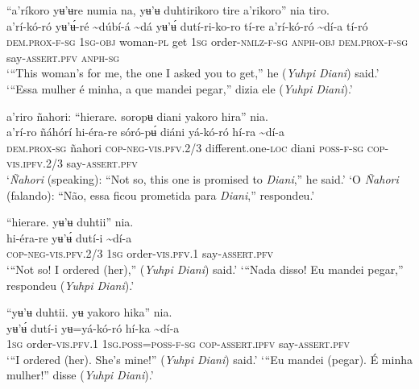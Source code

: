 \documentclass[output=paper,
modfonts,nonflat
]{langsci/langscibook}
\begin{document}
\ea “a’ríkoro yʉ’ʉre numia na, yʉ’ʉ duhtirikoro tire a’rikoro” nia tiro. \\[.3em]
\gll a’rí-kó-ró	yʉ’ʉ́-ré	{\textasciitilde}dúbí-á	{\textasciitilde}dá yʉ’ʉ́	dutí-ri-ko-ro	tí-re	a’rí-kó-ró	{\textasciitilde}dí-a	tí-ró \\
     \textsc{dem.prox-f-sg}	\textsc{1sg-obj}	woman-\textsc{pl}	get 1\textsc{sg}	order-\textsc{nmlz-f-sg}	\textsc{anph-obj}	\textsc{dem.prox-f-sg}	say-\textsc{assert.pfv}	\textsc{anph-sg} \\
\glt ‘“This woman's for me, the one I asked you to get,” he (\textit{Yuhpi Diani}) said.’
\glt ‘“Essa mulher é minha, a que mandei pegar,” dizia ele (\textit{Yuhpi Diani}).’
\z 
 
\ea a’riro ñahori: “hierare. soropʉ diani yakoro hira” nia. \\[.3em]
\gll a’rí-ro	ñáhórí	hi-éra-re sóró-pʉ́	diáni	yá-kó-ró	hí-ra	{\textasciitilde}dí-a \\
     \textsc{dem.prox-sg}	ñahori	\textsc{cop-neg-vis.pfv.}2/3 different.one-\textsc{loc}	diani	\textsc{poss-f-sg}	\textsc{cop-vis.ipfv.}2/3	say-\textsc{assert.pfv} \\
\glt ‘\textit{Ñahori} (speaking): “Not so, this one is promised to \textit{Diani},” he said.’
\glt ‘O \textit{Ñahori}  (falando): “Não, essa ficou prometida para \textit{Diani},” respondeu.’
\z 

\ea “hierare. yʉ’ʉ duhtii” nia. \\[.3em]
\gll hi-éra-re	yʉ’ʉ́	dutí-i	{\textasciitilde}dí-a \\
     \textsc{cop-neg-vis.pfv.}2/3	1\textsc{sg}	order-\textsc{vis.pfv.}1	say-\textsc{assert.pfv} \\
\glt ‘“Not so! I ordered (her),” (\textit{Yuhpi Diani}) said.’
\glt ‘“Nada disso! Eu mandei pegar,” respondeu (\textit{Yuhpi Diani}).’
\z 

\newpage
\ea “yʉ’ʉ duhtii. yʉ yakoro hika” nia.  \\[.3em]
\gll yʉ’ʉ́	dutí-i	yʉ=yá-kó-ró	hí-ka	{\textasciitilde}dí-a\\
     1\textsc{sg} order-\textsc{vis.pfv.}1	1\textsc{sg.poss=poss-f-sg}	\textsc{cop-assert.ipfv}	say-\textsc{assert.pfv}{\footnotemark} \\
\glt ‘“I ordered (her). She's mine!” (\textit{Yuhpi Diani}) said.’ 
\glt ‘“Eu mandei (pegar). É minha mulher!” disse (\textit{Yuhpi Diani}).’ 
\z
\end{document}
